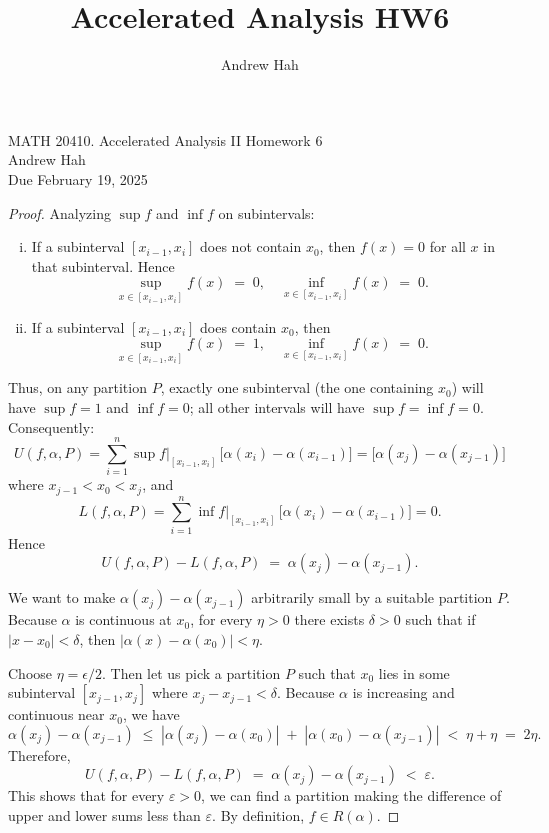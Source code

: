 \documentclass[11pt]{article}
\title{Accelerated Analysis HW6}
\author{Andrew Hah}
\begin{document}
\pagestyle{plain}
\begin{center}
{\Large MATH 20410. Accelerated Analysis II Homework 6} \\ 
\vspace{.2in}  
Andrew Hah \\
Due February 19, 2025
\end{center}

\begin{exercise}{6.1}
    \begin{proof} Analyzing $\sup f$ and $\inf f$ on subintervals:
\begin{enumerate} [(i)]
\item If a subinterval $[x_{i-1},x_i]$ does not contain $x_0$, then $f(x)=0$ for all $x$ in that subinterval. Hence
\[
\sup_{x\in[x_{i-1},x_i]} f(x)
\;=\;
0,
\quad
\inf_{x\in[x_{i-1},x_i]} f(x)
\;=\;
0.
\]
\item If a subinterval $[x_{i-1},x_i]$ does contain $x_0$, then 
\[
\sup_{x\in[x_{i-1},x_i]} f(x)
\;=\;
1,
\quad
\inf_{x\in[x_{i-1},x_i]} f(x)
\;=\;
0.
\]
\end{enumerate}

Thus, on any partition $P$, exactly one subinterval (the one containing $x_0$) will have $\sup f = 1$ and $\inf f = 0$; all other intervals will have $\sup f = \inf f = 0$.  Consequently:
\[
U(f,\alpha,P)
= \sum_{i=1}^n 
\sup f|_{[x_{i-1},x_i]}\,\bigl[\alpha(x_i)-\alpha(x_{i-1})\bigr]
= \bigl[\alpha(x_j) - \alpha(x_{j-1})\bigr]
\]
where $x_{j-1} < x_0 < x_j$, and
\[
L(f,\alpha,P)
= \sum_{i=1}^n 
\inf f|_{[x_{i-1},x_i]}\,\bigl[\alpha(x_i)-\alpha(x_{i-1})\bigr]
= 0.
\]
Hence
\[
U(f,\alpha,P) - L(f,\alpha,P)
\;=\;
\alpha(x_j) - \alpha(x_{j-1}).
\]

We want to make $\alpha(x_j) - \alpha(x_{j-1})$ arbitrarily small by a suitable partition $P$.  Because $\alpha$ is continuous at $x_0$, for every $\eta>0$ there exists $\delta>0$ such that if $|x - x_0| < \delta$, then $|\alpha(x) - \alpha(x_0)| < \eta$.  

Choose $\eta = \epsilon / 2$.  Then let us pick a partition $P$ such that $x_0$ lies in some subinterval $[x_{j-1},x_j]$ where $x_j-x_{j-1}<\delta$.  Because $\alpha$ is increasing and continuous near $x_0$, we have
\[
\alpha(x_j) - \alpha(x_{j-1})
\;\le\;
|\alpha(x_j) - \alpha(x_0)| 
\;+\;
|\alpha(x_0) - \alpha(x_{j-1})|
\;<\;
\eta + \eta
\;=\;
2\eta.
\]
Therefore,
\[
U(f,\alpha,P) - L(f,\alpha,P)
\;=\;
\alpha(x_j) - \alpha(x_{j-1})
\;<\;
\varepsilon.
\]
This shows that for every $\varepsilon>0$, we can find a partition making the difference of upper and lower sums less than $\varepsilon$.  By definition, $f\in R(\alpha)$.


\end{proof}
\end{exercise}
\end{document}
